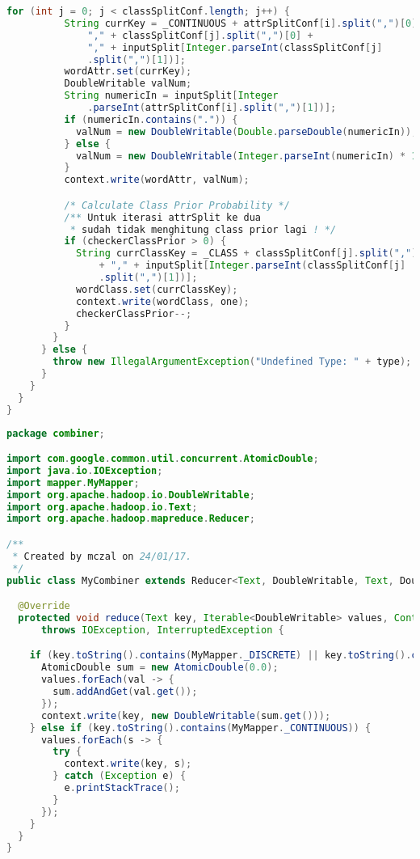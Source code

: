 \begin{lstlisting}[language=Java,basicstyle=\tiny,caption=MyMapper.java]
        for (int j = 0; j < classSplitConf.length; j++) {
          String currKey = _CONTINUOUS + attrSplitConf[i].split(",")[0] +
              "," + classSplitConf[j].split(",")[0] +
              "," + inputSplit[Integer.parseInt(classSplitConf[j]
              .split(",")[1])];
          wordAttr.set(currKey);
          DoubleWritable valNum;
          String numericIn = inputSplit[Integer
              .parseInt(attrSplitConf[i].split(",")[1])];
          if (numericIn.contains(".")) {
            valNum = new DoubleWritable(Double.parseDouble(numericIn));
          } else {
            valNum = new DoubleWritable(Integer.parseInt(numericIn) * 1.0);
          }
          context.write(wordAttr, valNum);

          /* Calculate Class Prior Probability */
          /** Untuk iterasi attrSplit ke dua
           * sudah tidak menghitung class prior lagi ! */
          if (checkerClassPrior > 0) {
            String currClassKey = _CLASS + classSplitConf[j].split(",")[0]
                + "," + inputSplit[Integer.parseInt(classSplitConf[j]
                .split(",")[1])];
            wordClass.set(currClassKey);
            context.write(wordClass, one);
            checkerClassPrior--;
          }
        }
      } else {
        throw new IllegalArgumentException("Undefined Type: " + type);
      }
    }
  }
}
\end{lstlisting}


\begin{lstlisting}[language=Java,basicstyle=\tiny,caption=MyCombiner.java]
package combiner;

import com.google.common.util.concurrent.AtomicDouble;
import java.io.IOException;
import mapper.MyMapper;
import org.apache.hadoop.io.DoubleWritable;
import org.apache.hadoop.io.Text;
import org.apache.hadoop.mapreduce.Reducer;

/**
 * Created by mczal on 24/01/17.
 */
public class MyCombiner extends Reducer<Text, DoubleWritable, Text, DoubleWritable> {

  @Override
  protected void reduce(Text key, Iterable<DoubleWritable> values, Context context)
      throws IOException, InterruptedException {

    if (key.toString().contains(MyMapper._DISCRETE) || key.toString().contains(MyMapper._CLASS)) {
      AtomicDouble sum = new AtomicDouble(0.0);
      values.forEach(val -> {
        sum.addAndGet(val.get());
      });
      context.write(key, new DoubleWritable(sum.get()));
    } else if (key.toString().contains(MyMapper._CONTINUOUS)) {
      values.forEach(s -> {
        try {
          context.write(key, s);
        } catch (Exception e) {
          e.printStackTrace();
        }
      });
    }
  }
}
\end{lstlisting}


